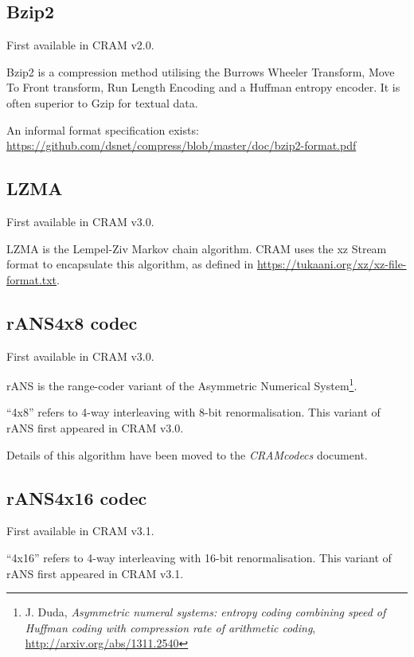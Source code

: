 \documentclass[a4paper]{article}
\begin{document}
\subsection{\textbf{Bzip2}}

First available in CRAM v2.0.

Bzip2 is a compression method utilising the Burrows Wheeler Transform, Move To Front transform, Run Length Encoding and a Huffman entropy encoder. 
It is often superior to Gzip for textual data.

An informal format specification exists:\\
\url{https://github.com/dsnet/compress/blob/master/doc/bzip2-format.pdf}

\subsection{\textbf{LZMA}}

First available in CRAM v3.0.

LZMA is the Lempel-Ziv Markov chain algorithm.
CRAM uses the xz Stream format to encapsulate this algorithm, as defined in \url{https://tukaani.org/xz/xz-file-format.txt}.

\subsection{\textbf{rANS4x8 codec}}

First available in CRAM v3.0.

rANS is the range-coder variant of the Asymmetric Numerical
System\footnote{J. Duda, \textit{Asymmetric numeral systems: entropy
    coding combining speed of Huffman coding with compression rate of
    arithmetic coding}, \url{http://arxiv.org/abs/1311.2540}}.

``4x8'' refers to 4-way interleaving with 8-bit renormalisation.\newline
This variant of rANS first appeared in CRAM v3.0.

Details of this algorithm have been moved to the \textit{CRAMcodecs} document.

\subsection{\textbf{rANS4x16 codec}}

First available in CRAM v3.1.

``4x16'' refers to 4-way interleaving with 16-bit renormalisation.\newline
This variant of rANS first appeared in CRAM v3.1.
\end{document}
